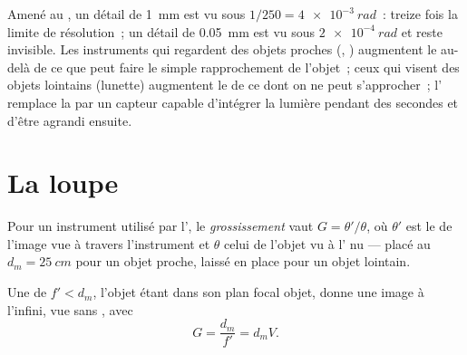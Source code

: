 \begin{remark}\label{rem:b1:optical-instruments:purpose}
Amené au , un détail de \qty{1}{mm} est vu sous $1/250 =
\qty{4e-3}{rad}$~: treize fois la limite de résolution~; un détail de
\qty{0.05}{mm} est vu sous $\qty{2e-4}{rad}$ et reste invisible. Les
instruments qui regardent des objets proches (, )
augmentent le  au-delà de ce que peut faire le simple
rapprochement de l'objet~; ceux qui visent des objets lointains
(lunette) augmentent le  de ce dont on ne peut
s'approcher~; l' remplace la  par un
capteur capable d'intégrer la lumière pendant des secondes et d'être
agrandi ensuite.
\end{remark}

\section{La loupe}

\begin{definition}[Grossissement]\label{def:b1:optical-instruments:G}
Pour un instrument utilisé par l', le \emph{grossissement} vaut
$G = \theta'/\theta$, où $\theta'$ est le  de l'image
vue à travers l'instrument et $\theta$ celui de l'objet vu à l' nu
--- placé au  $d_m = \qty{25}{cm}$ pour un objet proche,
laissé en place pour un objet lointain.
\end{definition}

\begin{proposition}[La loupe]\label{prop:b1:optical-instruments:loupe}
Une  de  $f' < d_m$, l'objet étant
dans son plan focal objet, donne une image à l'infini, vue sans
, avec
\[
G = \frac{d_m}{f'} = d_m V .
\]
\end{proposition}

